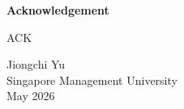 \begin{center}
{\LARGE \bf Acknowledgement}
\end{center}

ACK

\begin{flushright}
Jiongchi Yu\\
Singapore Management University\\
May 2026
\end{flushright}


